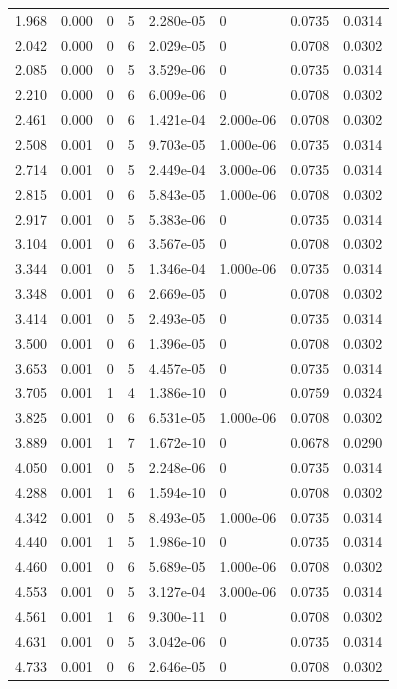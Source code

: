 \documentclass[preview]{standalone}
\begin{document}
{{\begin{tabular}{L{1.2cm}C{1.2cm} C{0.3cm}C{0.5cm} C{1.4cm}C{1.4cm} C{1.4cm}C{1.4cm}}
  1.968  &  0.000  & 0     &  5 &  2.280e-05  & 0  & 0.0735 &  0.0314   \\ 
  2.042  &  0.000  & 0     &  6 &  2.029e-05  & 0  & 0.0708 &  0.0302   \\ 
  2.085  &  0.000  & 0     &  5 &  3.529e-06  & 0  & 0.0735 &  0.0314   \\ 
  2.210  &  0.000  & 0     &  6 &  6.009e-06  & 0  & 0.0708 &  0.0302   \\ 
  2.461  &  0.000  & 0     &  6 &  1.421e-04  & 2.000e-06  & 0.0708 &  0.0302   \\ 
  2.508  &  0.001  & 0     &  5 &  9.703e-05  & 1.000e-06  & 0.0735 &  0.0314   \\ 
  2.714  &  0.001  & 0     &  5 &  2.449e-04  & 3.000e-06  & 0.0735 &  0.0314   \\ 
  2.815  &  0.001  & 0     &  6 &  5.843e-05  & 1.000e-06  & 0.0708 &  0.0302   \\ 
  2.917  &  0.001  & 0     &  5 &  5.383e-06  & 0  & 0.0735 &  0.0314   \\ 
  3.104  &  0.001  & 0     &  6 &  3.567e-05  & 0  & 0.0708 &  0.0302   \\ 
  3.344  &  0.001  & 0     &  5 &  1.346e-04  & 1.000e-06  & 0.0735 &  0.0314   \\ 
  3.348  &  0.001  & 0     &  6 &  2.669e-05  & 0  & 0.0708 &  0.0302   \\ 
  3.414  &  0.001  & 0     &  5 &  2.493e-05  & 0  & 0.0735 &  0.0314   \\ 
  3.500  &  0.001  & 0     &  6 &  1.396e-05  & 0  & 0.0708 &  0.0302   \\ 
  3.653  &  0.001  & 0     &  5 &  4.457e-05  & 0  & 0.0735 &  0.0314   \\ 
  3.705  &  0.001  & 1     &  4 &  1.386e-10  & 0  & 0.0759 &  0.0324   \\ 
  3.825  &  0.001  & 0     &  6 &  6.531e-05  & 1.000e-06  & 0.0708 &  0.0302   \\ 
  3.889  &  0.001  & 1     &  7 &  1.672e-10  & 0  & 0.0678 &  0.0290   \\ 
  4.050  &  0.001  & 0     &  5 &  2.248e-06  & 0  & 0.0735 &  0.0314   \\ 
  4.288  &  0.001  & 1     &  6 &  1.594e-10  & 0  & 0.0708 &  0.0302   \\ 
  4.342  &  0.001  & 0     &  5 &  8.493e-05  & 1.000e-06  & 0.0735 &  0.0314   \\ 
  4.440  &  0.001  & 1     &  5 &  1.986e-10  & 0  & 0.0735 &  0.0314   \\ 
  4.460  &  0.001  & 0     &  6 &  5.689e-05  & 1.000e-06  & 0.0708 &  0.0302   \\ 
  4.553  &  0.001  & 0     &  5 &  3.127e-04  & 3.000e-06  & 0.0735 &  0.0314   \\ 
  4.561  &  0.001  & 1     &  6 &  9.300e-11  & 0  & 0.0708 &  0.0302   \\ 
  4.631  &  0.001  & 0     &  5 &  3.042e-06  & 0  & 0.0735 &  0.0314   \\ 
  4.733  &  0.001  & 0     &  6 &  2.646e-05  & 0  & 0.0708 &  0.0302   \\ 
\hline 
\end{tabular} 

}}
\end{document}
